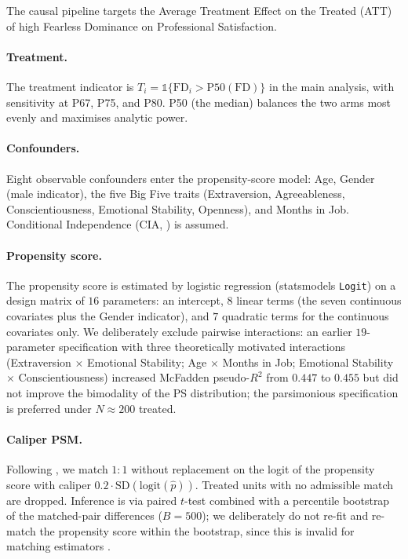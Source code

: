 \documentclass[11pt,a4paper]{article}
\begin{document}
The causal pipeline targets the Average Treatment Effect on the
Treated (ATT) of high Fearless Dominance on Professional Satisfaction.

\paragraph{Treatment.} The treatment indicator is
$T_i = \mathbb{1}\{\text{FD}_i > \text{P50}(\text{FD})\}$ in the main
analysis, with sensitivity at P67, P75, and P80. P50 (the median)
balances the two arms most evenly and maximises analytic power.

\paragraph{Confounders.} Eight observable confounders enter the
propensity-score model: Age, Gender (male indicator), the five Big
Five traits (Extraversion, Agreeableness, Conscientiousness,
Emotional Stability, Openness), and Months in Job. Conditional
Independence (CIA, \citealp{rosenbaum1983,imbens2015}) is assumed.

\paragraph{Propensity score.} The propensity score is estimated by
logistic regression (statsmodels \texttt{Logit}) on a design matrix
of $16$ parameters: an intercept, $8$ linear terms (the seven
continuous covariates plus the Gender indicator), and $7$ quadratic
terms for the continuous covariates only. We deliberately exclude
pairwise interactions: an earlier $19$-parameter specification with
three theoretically motivated interactions (Extraversion $\times$
Emotional Stability; Age $\times$ Months in Job; Emotional Stability
$\times$ Conscientiousness) increased McFadden pseudo-$R^2$ from
$0.447$ to $0.455$ but did not improve the bimodality of the PS
distribution; the parsimonious specification is preferred under
$N \approx 200$ treated.

\paragraph{Caliper PSM.} Following \citet{austin2011}, we match $1{:}1$
without replacement on the logit of the propensity score with caliper
$0.2 \cdot \text{SD}(\text{logit}(\hat{p}))$. Treated units with no
admissible match are dropped. Inference is via paired $t$-test
combined with a percentile bootstrap of the matched-pair differences
($B=500$); we deliberately do not re-fit and re-match the propensity
score within the bootstrap, since this is invalid for matching
estimators \citep{abadie2008}.
\end{document}
